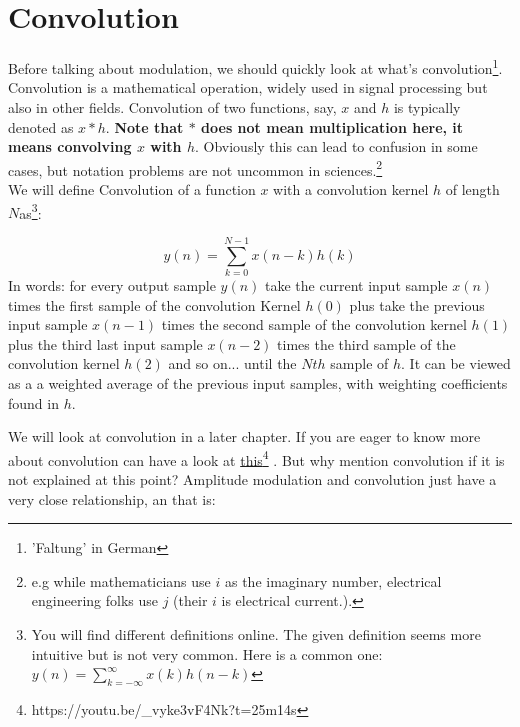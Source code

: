 \section{Convolution}
\label{sub:conv}
Before talking about modulation, we should quickly look at what's convolution\footnote{'Faltung' in German}.\\
Convolution is a mathematical operation, widely used in signal processing but also in other fields. Convolution of two functions, say, $x$ and $h$ is typically denoted as $x*h$. \textbf{Note that $*$ does not mean multiplication here, it means convolving $x$ with $h$}. Obviously this can lead to confusion in some cases, but notation problems are not uncommon in sciences.\footnote{e.g while mathematicians use $i$ as the imaginary number, electrical engineering folks use $j$ (their $i$ is electrical current.).}\\

We will define Convolution of a function $x$ with a convolution kernel $h$ of length $N$as\footnote{You will find different definitions online. The given definition seems more intuitive but is not very common. Here is a common one:$y(n) = \sum_{k=-\infty}^{\infty} x(k) h (n-k)$}:

\begin{equation}
y(n) = \sum_{k=0}^{N-1} x(n-k) h (k)
\end{equation}
In words: for every output sample $y(n)$ take the current input sample $x(n)$ times the first sample of the convolution Kernel $h(0)$ plus take the previous input sample $x(n-1)$ times the second sample of the convolution kernel $h(1)$ plus the third last input sample $x(n-2)$ times the third sample of the convolution kernel $h(2)$ and so on... until the $Nth$ sample of $h$. It can be viewed as a a weighted average of the previous input samples, with weighting coefficients found in $h$.

We will look at convolution in a later chapter. If you  are eager to know more about convolution can have a look at
\href{https://youtu.be/_vyke3vF4Nk?t=25m14s}{this}\footnote{https://youtu.be/\_vyke3vF4Nk?t=25m14s}
. But why mention convolution if it is not explained at this point? Amplitude modulation and convolution just have a very close relationship, an that is:



